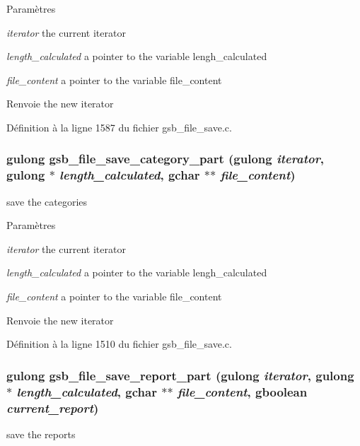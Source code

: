 \begin{DoxyParams}{Paramètres}
\item[{\em iterator}]the current iterator \item[{\em length\_\-calculated}]a pointer to the variable lengh\_\-calculated \item[{\em file\_\-content}]a pointer to the variable file\_\-content\end{DoxyParams}
\begin{DoxyReturn}{Renvoie}
the new iterator 
\end{DoxyReturn}


Définition à la ligne 1587 du fichier gsb\_\-file\_\-save.c.

\subsubsection[{gsb\_\-file\_\-save\_\-category\_\-part}]{\setlength{\rightskip}{0pt plus 5cm}gulong gsb\_\-file\_\-save\_\-category\_\-part (gulong {\em iterator}, \/  gulong $\ast$ {\em length\_\-calculated}, \/  gchar $\ast$$\ast$ {\em file\_\-content})}\label{gsb__file__save_8c_af255442e956aa95c1b2c223b4cd07481}
save the categories


\begin{DoxyParams}{Paramètres}
\item[{\em iterator}]the current iterator \item[{\em length\_\-calculated}]a pointer to the variable lengh\_\-calculated \item[{\em file\_\-content}]a pointer to the variable file\_\-content\end{DoxyParams}
\begin{DoxyReturn}{Renvoie}
the new iterator 
\end{DoxyReturn}


Définition à la ligne 1510 du fichier gsb\_\-file\_\-save.c.

\subsubsection[{gsb\_\-file\_\-save\_\-report\_\-part}]{\setlength{\rightskip}{0pt plus 5cm}gulong gsb\_\-file\_\-save\_\-report\_\-part (gulong {\em iterator}, \/  gulong $\ast$ {\em length\_\-calculated}, \/  gchar $\ast$$\ast$ {\em file\_\-content}, \/  gboolean {\em current\_\-report})}\label{gsb__file__save_8c_a3699f6e4d341e96824d32c5df54f6e8a}
save the reports


